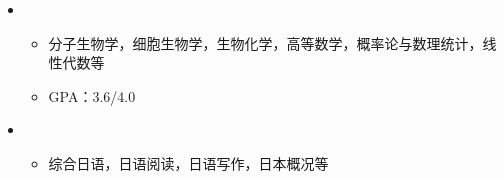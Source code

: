   \begin{itemize}[leftmargin=*]
    \item
      {\small
      \begin{itemize}
        \item{分子生物学，细胞生物学，生物化学，高等数学，概率论与数理统计，线性代数等}
        \item{GPA：3.6/4.0}
      \end{itemize}
	  }
	\item
		{\small
		\begin{itemize}
			\item{综合日语，日语阅读，日语写作，日本概况等}
		\end{itemize}
		}	
  \end{itemize}

